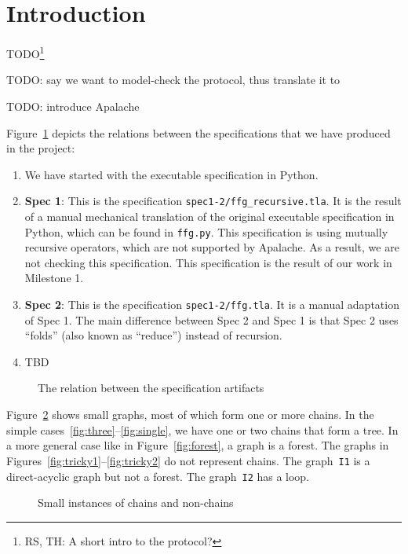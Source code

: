 
\section{Introduction}

TODO\footnote{RS, TH: A short intro to the protocol?}

TODO: say we want to model-check the protocol, thus translate it to \tlap{}

TODO: introduce Apalache

Figure~\ref{fig:artifacts} depicts the relations between the specifications
that we have produced in the project:

\begin{enumerate}
    \item We have started with the executable specification in Python.

    \item \textbf{Spec 1}: This is the specification
        \texttt{spec1-2/ffg\_recursive.tla}. It is the result of a manual
        mechanical translation of the original executable specification in
        Python, which can be found in \texttt{ffg.py}. This specification is
        using mutually recursive operators, which are not supported by
        Apalache. As a result, we are not checking this specification. This
        specification is the result of our work in Milestone 1.

    \item \textbf{Spec 2}: This is the specification \texttt{spec1-2/ffg.tla}. It
        is a manual adaptation of Spec 1. The main difference between Spec 2
        and Spec 1 is that Spec 2 uses ``folds'' (also known as ``reduce'')
        instead of recursion.

    \item TBD

\end{enumerate}

\begin{figure}
  
  \caption{The relation between the specification artifacts}\label{fig:artifacts}
\end{figure}

Figure~\ref{fig:block-graphs} shows small graphs, most of which form one or
more chains. In the simple cases~\ref{fig:three}--\ref{fig:single}, we have one
or two chains that form a tree. In a more general case like in
Figure~\ref{fig:forest}, a graph is a forest. The graphs in
Figures~\ref{fig:tricky1}--\ref{fig:tricky2} do not represent chains.  The
graph~\texttt{I1} is a direct-acyclic graph but not a forest. The
graph~\texttt{I2} has a loop.

\begin{figure}
  
  \caption{Small instances of chains and non-chains}\label{fig:block-graphs}
\end{figure}

